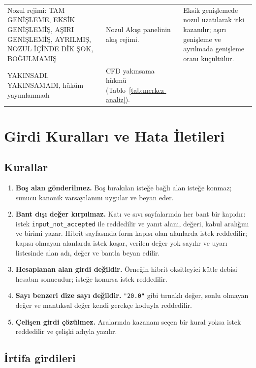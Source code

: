 \documentclass[11pt,a4paper]{article}
\newcommand{\ui}[1]{\textsf{#1}}
\newcommand{\kod}[1]{\texttt{#1}}
\begin{document}
\begin{longtable}{@{}>{\raggedright\arraybackslash}p{4.0cm}>{\raggedright\arraybackslash}p{6.0cm}>{\raggedright\arraybackslash}p{5.6cm}@{}}
Nozul rejimi: \ui{TAM GENİŞLEME}, \ui{EKSİK GENİŞLEMİŞ}, \ui{AŞIRI GENİŞLEMİŞ}, \ui{AYRILMIŞ}, \ui{NOZUL İÇİNDE DİK ŞOK}, \ui{BOĞULMAMIŞ} & Nozul Akışı panelinin akış rejimi. & Eksik genişlemede nozul uzatılarak itki kazanılır; aşırı genişleme ve ayrılmada genişleme oranı küçültülür. \\
\ui{YAKINSADI}, \ui{YAKINSAMADI}, hüküm yayımlanmadı & CFD yakınsama hükmü (Tablo~\ref{tab:merkez-analiz}). & \\
\end{longtable}

\section{Girdi Kuralları ve Hata İletileri}\label{sec:girdikural}

\subsection{Kurallar}

\begin{enumerate}[leftmargin=1.6em]
  \item \textbf{Boş alan gönderilmez.} Boş bırakılan isteğe bağlı alan isteğe
  konmaz; sunucu kanonik varsayılanını uygular ve beyan eder.
  \item \textbf{Bant dışı değer kırpılmaz.} Katı ve sıvı sayfalarında her bant
  bir kapıdır: istek \kod{input\_\allowbreak{}not\_\allowbreak{}accepted} ile reddedilir ve yanıt alanı,
  değeri, kabul aralığını ve birimi yazar. Hibrit sayfasında form kapısı olan
  alanlarda istek reddedilir; kapısı olmayan alanlarda istek koşar, verilen
  değer yok sayılır ve uyarı listesinde alan adı, değer ve bantla beyan edilir.
  \item \textbf{Hesaplanan alan girdi değildir.} Örneğin hibrit oksitleyici
  kütle debisi hesabın sonucudur; isteğe konursa istek reddedilir.
  \item \textbf{Sayı benzeri dize sayı değildir.} \kod{"20.0"} gibi tırnaklı
  değer, sonlu olmayan değer ve mantıksal değer kendi gerekçe koduyla
  reddedilir.
  \item \textbf{Çelişen girdi çözülmez.} Aralarında kazananı seçen bir kural
  yoksa istek reddedilir ve çelişki adıyla yazılır.
\end{enumerate}

\subsection{İrtifa girdileri}\label{sec:irtifa}
\end{document}
